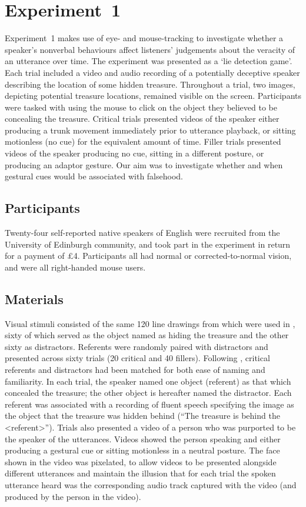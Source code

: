 \documentclass[a4paper,man,natbib]{apa6}
\begin{document}
\section{Experiment~1}
Experiment~1 makes use of eye- and mouse-tracking to investigate whether a speaker's nonverbal behaviours affect listeners' judgements about the veracity of an utterance over time. 
The experiment was presented as a `lie detection game'.
Each trial included a video and audio recording of a potentially deceptive speaker describing the location of some hidden treasure.
Throughout a trial, two images, depicting potential treasure locations, remained visible on the screen. 
Participants were tasked with using the mouse to click on the object they believed to be concealing the treasure.
Critical trials presented videos of the speaker either producing a trunk movement immediately prior to utterance playback, or sitting motionless (no cue) for the equivalent amount of time.
Filler trials presented videos of the speaker producing no cue, sitting in a different posture, or producing an adaptor gesture. 
Our aim was to investigate whether and when gestural cues would be associated with falsehood.

\subsection{Participants}
Twenty-four self-reported native speakers of English were recruited from the University of Edinburgh community, and took part in the experiment in return for a payment of \pounds{}4.
Participants all had normal or corrected-to-normal vision, and were all right-handed mouse users.

\subsection{Materials}
Visual stimuli consisted of the same 120 line drawings from \citet{Snodgrass1980} which were used in \citet{Loy2017}, sixty of which served as the object named as hiding the treasure and the other sixty as distractors.
Referents were randomly paired with distractors and presented across sixty trials (20 critical and 40 fillers). 
Following \citet{Loy2017}, critical referents and distractors had been matched for both ease of naming and familiarity.
In each trial, the speaker named one object (referent) as that which concealed the treasure; the other object is hereafter named the distractor.
Each referent was associated with a recording of fluent speech specifying the image as the object that the treasure was hidden behind (``The treasure is behind the <referent>'').
Trials also presented a video of a person who was purported to be the speaker of the utterances. 
Videos showed the person speaking and either producing a gestural cue or sitting motionless in a neutral posture.
The face shown in the video was pixelated, to allow videos to be presented alongside different utterances and maintain the illusion that for each trial the spoken utterance heard was the corresponding audio track captured with the video (and produced by the person in the video).
\end{document}

